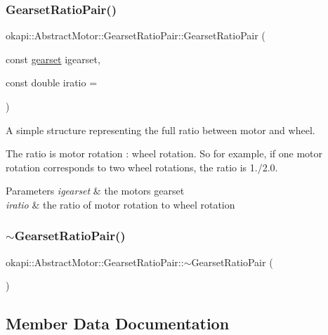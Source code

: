 \subsubsection{\texorpdfstring{GearsetRatioPair()}{GearsetRatioPair()}}
{\footnotesize\ttfamily okapi\+::\+Abstract\+Motor\+::\+Gearset\+Ratio\+Pair\+::\+Gearset\+Ratio\+Pair (\begin{DoxyParamCaption}\item[{const \mbox{\hyperlink{classokapi_1_1AbstractMotor_a88aaa6ea2fa10f5520a537bbf26774d5}{gearset}}}]{igearset,  }\item[{const double}]{iratio = {} }\end{DoxyParamCaption})\hspace{0.3cm}{\ttfamily [inline]}}

A simple structure representing the full ratio between motor and wheel.

The ratio is motor rotation \+: wheel rotation. So for example, if one motor rotation corresponds to two wheel rotations, the ratio is 1./2.0.


\begin{DoxyParams}{Parameters}
{\em igearset} & the motor\textquotesingle{}s gearset \\
\hline
{\em iratio} & the ratio of motor rotation to wheel rotation \\
\hline
\end{DoxyParams}
\mbox{\label{structokapi_1_1AbstractMotor_1_1GearsetRatioPair_a78b0163286cab14b29c8545aaf8ccd9d}} 
\subsubsection{\texorpdfstring{$\sim$GearsetRatioPair()}{~GearsetRatioPair()}}
{\footnotesize\ttfamily okapi\+::\+Abstract\+Motor\+::\+Gearset\+Ratio\+Pair\+::$\sim$\+Gearset\+Ratio\+Pair (\begin{DoxyParamCaption}{ }\end{DoxyParamCaption})\hspace{0.3cm}{\ttfamily [default]}}



\subsection{Member Data Documentation}
\mbox{\label{structokapi_1_1AbstractMotor_1_1GearsetRatioPair_aa98dba092145fa1f0f2669d754e2e37d}} 
